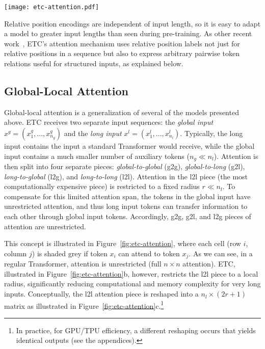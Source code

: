 \documentclass[11pt,a4paper]{article}
\begin{document}
\begin{figure*}[t!]
	\texttt{[image: etc-attention.pdf]}
	\centering
	\caption{Sparsity diagram showing which attention queries (rows) can attend to which attention keys (columns) a) for standard Transformer attention with input size $n$; b) for global-local attention with input sizes $n_g$, $n_l$, and radius $r$; c) how the l2l attention piece is reshaped into a much smaller attention matrix, limited by local radius.}
	\label{fig:etc-attention}
\end{figure*}

Relative position encodings are independent of input length, so it is easy to adapt a model to greater input lengths than seen during pre-training. As other recent work~\cite{shaw2019generating},  ETC's attention mechanism uses relative position labels not just for relative positions in a sequence but also to express arbitrary pairwise token relations useful for structured inputs, as explained below.

\subsection{Global-Local Attention}



Global-local attention is a generalization of several of the models presented above. ETC receives two separate input sequences: the {\em global input} $x^g = (x^g_1, ..., x^g_{n_g})$ and the {\em long input} $x^l = (x^l_1, ..., x^l_{n_l})$. Typically, the long input contains the input a standard Transformer would receive, while the global input contains a much smaller number of auxiliary tokens ($n_g \ll n_l$). Attention is then split into four separate pieces: {\em global-to-global} (g2g),  {\em global-to-long} (g2l),  {\em long-to-global} (l2g), and  {\em long-to-long} (l2l). 
Attention in the l2l piece (the most computationally expensive piece) is restricted to a fixed radius $r \ll n_l$. To compensate for this limited attention span, the tokens in the global input have unrestricted attention, and thus long input tokens can transfer information to each other through global input tokens. Accordingly, g2g, g2l, and l2g pieces of attention are unrestricted. 

This concept is illustrated in Figure~\ref{fig:etc-attention}, where each cell (row $i$, column $j$) is shaded grey if token $x_i$ can attend to token $x_j$. As we can see, in a regular Transformer, attention is unrestricted (full $n \times n$ attention). ETC, illustrated in Figure~\ref{fig:etc-attention}b, however, restricts the l2l piece to a local radius, significantly reducing computational and memory complexity for very long inputs. Conceptually, the l2l attention piece is reshaped into a $n_l \times (2r+1)$ matrix as illustrated in Figure~\ref{fig:etc-attention}c.\footnote{In practice, for GPU/TPU efficiency, a different reshaping occurs that yields identical outputs (see the appendices).}
\end{document}
